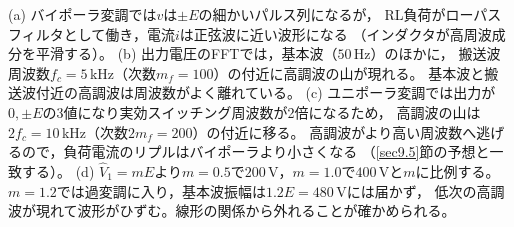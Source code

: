 \begin{enumerate}
(a) バイポーラ変調では$v$は$\pm E$の細かいパルス列になるが，
RL負荷がローパスフィルタとして働き，電流$i$は正弦波に近い波形になる
（インダクタが高周波成分を平滑する）。
(b) 出力電圧のFFTでは，基本波（$50$\,Hz）のほかに，
搬送波周波数$f_c = 5$\,kHz（次数$m_f = 100$）の付近に高調波の山が現れる。
基本波と搬送波付近の高調波は周波数がよく離れている。
(c) ユニポーラ変調では出力が$0, \pm E$の3値になり実効スイッチング周波数が2倍になるため，
高調波の山は$2f_c = 10$\,kHz（次数$2m_f = 200$）の付近に移る。
高調波がより高い周波数へ逃げるので，負荷電流のリプルはバイポーラより小さくなる
（\ref{sec9.5}節の予想と一致する）。
(d) $\hat{V}_1 = mE$より$m = 0.5$で$200$\,V，$m = 1.0$で$400$\,Vと$m$に比例する。
$m = 1.2$では過変調に入り，基本波振幅は$1.2E = 480$\,Vには届かず，
低次の高調波が現れて波形がひずむ。線形の関係から外れることが確かめられる。

\end{enumerate}
